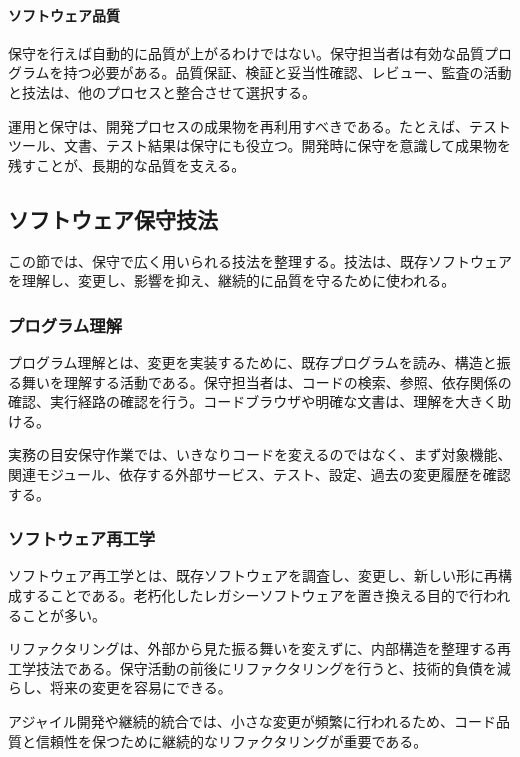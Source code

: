 \documentclass[a4paper,11pt]{ltjsarticle}
\numberwithin{figure}{section}
\numberwithin{table}{section}
\begin{document}
\paragraph{ソフトウェア品質}
保守を行えば自動的に品質が上がるわけではない。保守担当者は有効な品質プログラムを持つ必要がある。品質保証、検証と妥当性確認、レビュー、監査の活動と技法は、他のプロセスと整合させて選択する。\par
運用と保守は、開発プロセスの成果物を再利用すべきである。たとえば、テストツール、文書、テスト結果は保守にも役立つ。開発時に保守を意識して成果物を残すことが、長期的な品質を支える。\par
\subsection{ソフトウェア保守技法}
この節では、保守で広く用いられる技法を整理する。技法は、既存ソフトウェアを理解し、変更し、影響を抑え、継続的に品質を守るために使われる。\par
\subsubsection{プログラム理解}
プログラム理解とは、変更を実装するために、既存プログラムを読み、構造と振る舞いを理解する活動である。保守担当者は、コードの検索、参照、依存関係の確認、実行経路の確認を行う。コードブラウザや明確な文書は、理解を大きく助ける。\par
\begin{pointbox}{実務の目安}保守作業では、いきなりコードを変えるのではなく、まず対象機能、関連モジュール、依存する外部サービス、テスト、設定、過去の変更履歴を確認する。\end{pointbox}
\subsubsection{ソフトウェア再工学}
ソフトウェア再工学とは、既存ソフトウェアを調査し、変更し、新しい形に再構成することである。老朽化したレガシーソフトウェアを置き換える目的で行われることが多い。\par
リファクタリングは、外部から見た振る舞いを変えずに、内部構造を整理する再工学技法である。保守活動の前後にリファクタリングを行うと、技術的負債を減らし、将来の変更を容易にできる。\par
アジャイル開発や継続的統合では、小さな変更が頻繁に行われるため、コード品質と信頼性を保つために継続的なリファクタリングが重要である。\par
\end{document}
